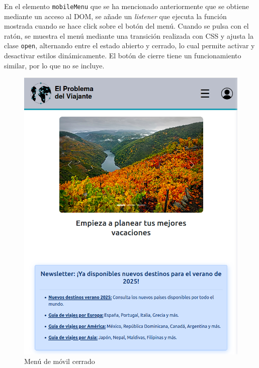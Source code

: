 \documentclass[11pt, a4paper]{book}
\begin{document}
	En el elemento \texttt{mobileMenu} que se ha mencionado anteriormente que se obtiene mediante un acceso al DOM, se añade un \textit{listener} que ejecuta la función mostrada cuando se hace click sobre el botón del menú. Cuando se pulsa con el ratón, se muestra el menú mediante una transición realizada con CSS y ajusta la clase \texttt{open}, alternando entre el estado abierto y cerrado, lo cual permite activar y desactivar estilos dinámicamente. El botón de cierre tiene un funcionamiento similar, por lo que no se incluye.
	
	\begin{figure} [H]
		\centering
		\includegraphics[height=0.4\textheight]{CSS/1-5 768.png}
		\caption{Menú de móvil cerrado}
	\end{figure}
\end{document}

